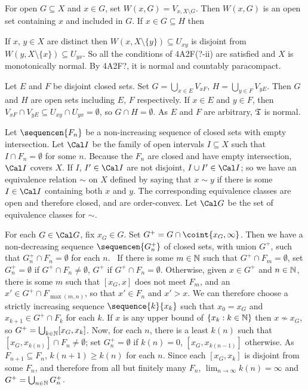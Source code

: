 {{\medskip

 For open $G\subseteq X$ and $x\in G$, set
$W(x,G)=V_{x,X\setminus G}$.   Then $W(x,G)$ is an open set containing $x$
and included in $G$.   If $x\in G\subseteq H$ then


\noindent If $x$, $y\in X$ are distinct then
$W(x,X\setminus\{y\})\subseteq U_{xy}$ is
disjoint from $W(y,X\setminus\{x\})\subseteq U_{yx}$.   So all the
conditions of 4A2F(?-ii) are satisfied and $X$ is monotonically normal.
By 4A2F?, it is normal and countably paracompact.
}%

 Let $E$ and $F$ be disjoint closed sets.   Set
$G=\bigcup_{x\in E}V_{xF}$, $H=\bigcup_{y\in F}V_{yE}$.   Then $G$ and
$H$ are open sets including $E$, $F$ respectively.   If $x\in E$ and
$y\in F$, then $V_{xF}\cap V_{yE}\subseteq U_{xy}\cap U_{yx}=\emptyset$,
so $G\cap H=\emptyset$.   As $E$ and $F$ are arbitrary, $\frak T$ is
normal.

\medskip

 Let $\sequencen{F_n}$ be a non-increasing sequence of
closed sets with empty intersection.   Let $\Cal I$ be the family of
open intervals $I\subseteq X$ such that $I\cap F_n=\emptyset$ for some
$n$.   Because the $F_n$ are closed and have empty intersection,
$\Cal I$ covers $X$.   If $I$, $I'\in\Cal I$ are not
disjoint, $I\cup I'\in\Cal I$;  so we have an equivalence relation
$\sim$ on $X$ defined by saying that $x\sim y$ if there is some
$I\in\Cal I$ containing both $x$ and $y$.   The corresponding
equivalence classes are open and therefore closed, and are order-convex.
Let $\Cal G$ be the set of equivalence classes for $\sim$.

For each $G\in\Cal G$, fix $x_G\in G$.   Set
$G^+=G\cap\coint{x_G,\infty}$.   Then we have a
non-decreasing sequence $\sequencen{G^+_n}$ of closed sets, with union
$G^+$, such that $G^+_n\cap F_n=\emptyset$ for each $n$.
\Prf\ If there is some $m\in\Bbb N$ such that
$G^+\cap F_m=\emptyset$, set $G^+_n=\emptyset$ if
$G^+\cap F_n\ne\emptyset$, $G^+$ if $G^+\cap F_n=\emptyset$.   Otherwise,
given $x\in G^+$ and $n\in\Bbb N$, there is some $m$ such that $[x_G,x]$
does not meet $F_m$, and an $x'\in G^+\cap F_{\max(m,n)}$, so that
$x'\in F_n$ and $x'>x$.   We can therefore choose a strictly increasing
sequence $\sequence{k}{x_k}$ such that $x_0=x_G$ and
$x_{k+1}\in G^+\cap F_k$ for each $k$.
If $x$ is any upper bound of $\{x_k:k\in\Bbb N\}$ then $x\not\sim x_G$,
so $G^+=\bigcup_{k\in\Bbb N}[x_G,x_k]$.   Now, for each $n$, there is a
least $k(n)$ such that $[x_G,x_{k(n)}]\cap F_n\ne\emptyset$;  set
$G^+_n=\emptyset$ if $k(n)=0$, $[x_G,x_{k(n-1)}]$ otherwise.
As $F_{n+1}\subseteq F_n$, $k(n+1)\ge k(n)$
for each $n$.   Since each $[x_G,x_k]$ is disjoint from some
$F_n$, and therefore from all but finitely many $F_n$,
$\lim_{n\to\infty}k(n)=\infty$ and $G^+=\bigcup_{n\in\Bbb N}G^+_n$.\ \Qed

}
